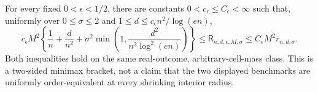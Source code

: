 For every fixed \(0<\epsilon<1/2\), there are constants \(0<c_{\epsilon}\le C_{\epsilon}<\infty\) such that, uniformly over \(0\le\sigma\le2\) and \(1\le d\le c_{\epsilon}n^2/\log(en)\),
\[
 c_{\epsilon}M^2\left\{\frac1n+\frac d{n^2}+\sigma^2\min\left(1,\frac{d^2}{n^2\log^2(en)}\right)\right\}
 \le\mathsf R_{n,d,\epsilon,M,\sigma}
 \le C_{\epsilon}M^2r_{n,d,\sigma}.
\]
Both inequalities hold on the same real-outcome, arbitrary-cell-mass class.  This is a two-sided minimax bracket, not a claim that the two displayed benchmarks are uniformly order-equivalent at every shrinking interior radius.